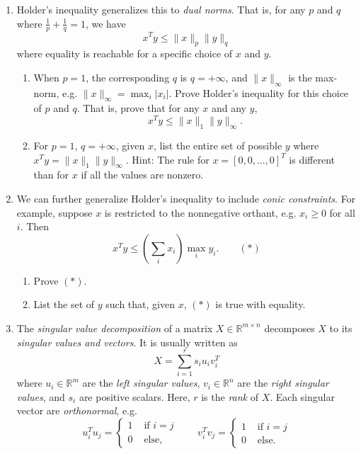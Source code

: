 \documentclass{article}
\newcommand{\R}{\mathbb R}
\begin{document}
\begin{enumerate}
\item Holder's inequality generalizes this to \emph{dual norms}. That is, for any $p$ and $q$ where $\frac{1}{p} + \frac{1}{q} = 1$, we have 
\[
x^Ty \leq \|x\|_p\|y\|_q
\]
where equality is reachable for a specific choice of $x$ and $y$.

\begin{enumerate}
\item When $p = 1$, the corresponding $q$ is $q = +\infty$, and $\|x\|_\infty$ is the max-norm, e.g. $\|x\|_\infty = \max_i |x_i|$. Prove Holder's inequality for this choice of $p$ and $q$.
That is, prove that for any $x$ and any $y$, 
\[
x^Ty \leq \|x\|_1\|y\|_\infty.
\]

\item For $p = 1$, $q = +\infty$, given $x$, list the entire set of possible $y$ where $x^Ty = \|x\|_1\|y\|_\infty$. Hint: The rule for $x = [0,0,...,0]^T$ is different than for $x$ if all the values are nonzero.


\end{enumerate}
\item We can further generalize Holder's inequality to include \emph{conic constraints}. For example, suppose $x$ is restricted to the nonnegative orthant, e.g. $x_i \geq 0$ for all $i$. 
Then 
\[
x^Ty \leq \left(\sum_i x_i\right) \max_i y_i.\qquad (*)
\]

\begin{enumerate}
\item Prove $(*)$.


\item List the set of $y$ such that, given $x$, $(*)$ is true with equality.


\end{enumerate}


\item The \emph{singular value decomposition} of a matrix $X\in \R^{m\times n}$ decomposes $X$ to its \emph{singular values and vectors}. It is usually written as 
\[
X = \sum_{i=1}^r s_iu_iv_i^T
\]
where $u_i\in \R^m$ are the \emph{left singular values}, $v_i\in \R^n$ are the \emph{right singular values}, and $s_i$ are positive scalars. Here, $r$ is the \emph{rank} of $X$. Each singular vector are \emph{orthonormal}, e.g.
\[
u_i^Tu_j = \begin{cases} 1 & \text{ if }i = j\\ 0 & \text{ else,} \end{cases} \qquad
v_i^Tv_j = \begin{cases} 1 & \text{ if }i = j\\ 0 & \text{ else.} \end{cases}
\]




\end{enumerate}
\end{document}
